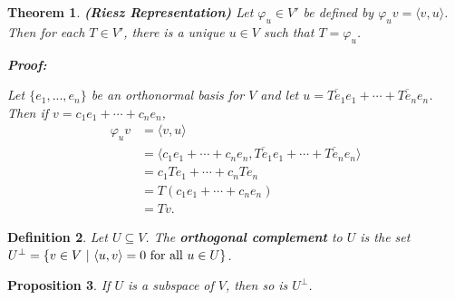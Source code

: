 \documentclass{article}
\theoremstyle{colontheorem}
\newtheorem{theorem}{Theorem}[section]
\newtheorem{proposition}[theorem]{Proposition}
\newtheorem{definition}[theorem]{Definition}
\newenvironment{Theorem}
{
	\begin{mdframed}[backgroundcolor=TheoremOrange!10]
	\begin{theorem}
}
{
	\end{theorem}
	\end{mdframed}
	
	\vspace{.15in}
}
\newenvironment{Proposition}
{
	\begin{mdframed}[backgroundcolor=TheoremOrange!10]
	\begin{proposition}
}
{
	\end{proposition}
	\end{mdframed}
	
	\vspace{.15in}
}
\newenvironment{Def}
{
	\begin{mdframed}[backgroundcolor=DefGreen!10]
	\begin{definition}
}
{
	\end{definition}
	\end{mdframed}
	
	\vspace{.15in}
}
\newenvironment{Proof}
{
	\begin{mdframed}[backgroundcolor=ProofPurple!10]
	\textbf{Proof:}%
}
{
	\end{mdframed}
	
	\vspace{.085in}
}
\begin{document}
\begin{Theorem}
	
	\textbf{(Riesz Representation)} Let $\varphi_u \in V'$ be defined by $\varphi_u v = \langle v, u \rangle$. Then for each $T \in V'$, there is a unique $u \in V$ such that $T = \varphi_u$.
	
	
	\begin{Proof}
		Let $\{e_1, ..., e_n\}$ be an orthonormal basis for $V$ and let $u = \overline{Te_1}e_1 + \cdots + \overline{Te_n}e_n$. Then if $v = c_1 e_1 + \cdots + c_n e_n$,
		\begin{align*}
			\varphi_u v &= \langle v, u \rangle\\
			&= \langle c_1 e_1 + \cdots + c_n e_n, \overline{Te_1}e_1 + \cdots + \overline{Te_n}e_n \rangle\\
			&= c_1 T e_1 + \cdots + c_n T e_n\\
			&= T(c_1 e_1 + \cdots + c_n e_n)\\
			&= Tv.
		\end{align*}
		
	\end{Proof}
	
\end{Theorem}



\begin{Def}
	
	Let $U \subseteq V$. The \textbf{orthogonal complement} to $U$ is the set $U^\perp = \{v \in V\ |\ \langle u, v \rangle = 0\ \textnormal{for all}\ u \in U\}$.
	
\end{Def}



\begin{Proposition}
	
	If $U$ is a subspace of $V$, then so is $U^\perp$.
	
\end{Proposition}
\end{document}
